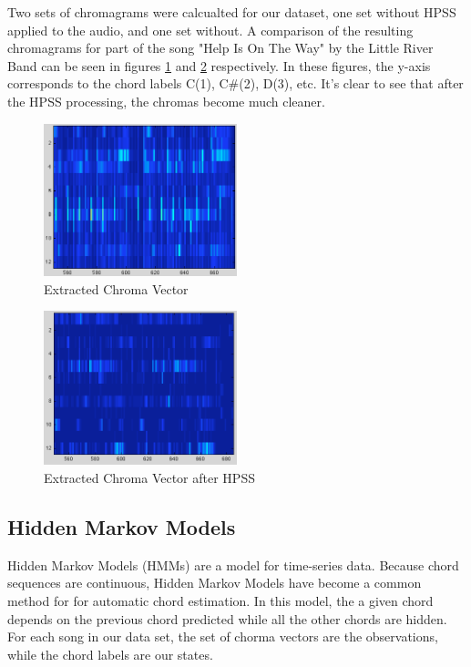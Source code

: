 \documentclass{article}
\begin{document}
Two sets of chromagrams were calcualted for our dataset, one set without HPSS applied to
the audio, and one set without. A comparison of the resulting chromagrams for part of the 
song "Help Is On The Way" by the Little River Band can be seen in figures \ref{fig:ChromaNorm} and \ref{fig:ChromaHPSS}  respectively. In these figures,
the y-axis corresponds to the chord labels C(1), C\#(2), D(3), etc. It's clear to see that
after the HPSS processing, the chromas become much cleaner.

\begin{figure}
	\centering
	\includegraphics[width=0.5\textwidth]{187.png}
	\caption{Extracted Chroma Vector}
	\label{fig:ChromaNorm}
\end{figure}

\begin{figure}
	\centering
	\includegraphics[width=0.5\textwidth]{187h.png}
	\caption{Extracted Chroma Vector after HPSS}
	\label{fig:ChromaHPSS}
\end{figure}

\subsection{Hidden Markov Models}

Hidden Markov Models (HMMs) are a model for time-series data. Because chord sequences are continuous,  Hidden Markov Models have become a common method for for automatic chord estimation. In this model, the a given chord depends on the previous chord predicted while all the other chords are hidden. For each song in our data set, the set of chorma vectors are the observations, while the chord labels are our states. 
\end{document}
